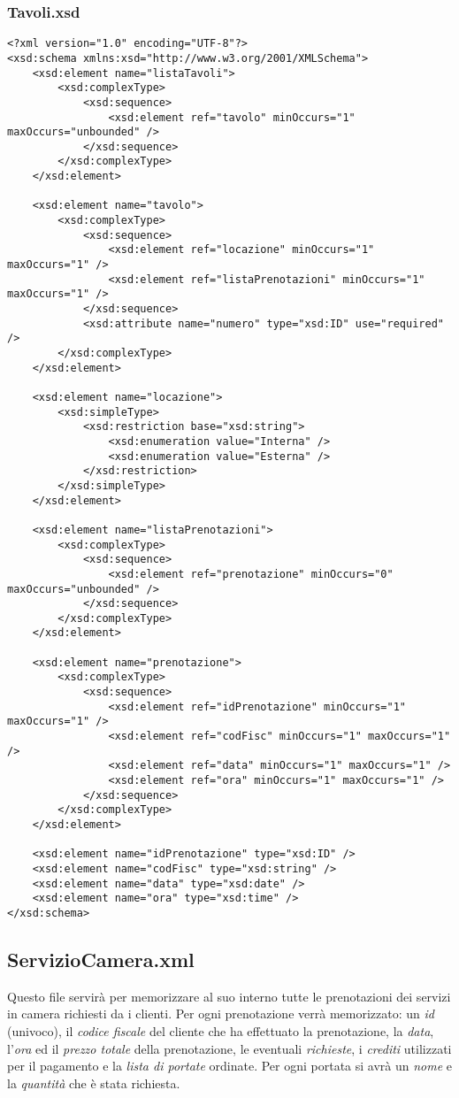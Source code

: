\documentclass [a4paper, 12pt]{book}
\begin{document}
\subsubsection{Tavoli.xsd}
\begin{lstlisting}[style=XML]
<?xml version="1.0" encoding="UTF-8"?>
<xsd:schema xmlns:xsd="http://www.w3.org/2001/XMLSchema">
    <xsd:element name="listaTavoli">
        <xsd:complexType>
            <xsd:sequence>
                <xsd:element ref="tavolo" minOccurs="1" maxOccurs="unbounded" />
            </xsd:sequence>
        </xsd:complexType>
    </xsd:element>

    <xsd:element name="tavolo">
        <xsd:complexType>
            <xsd:sequence>
                <xsd:element ref="locazione" minOccurs="1" maxOccurs="1" />
                <xsd:element ref="listaPrenotazioni" minOccurs="1" maxOccurs="1" />
            </xsd:sequence>
            <xsd:attribute name="numero" type="xsd:ID" use="required" />
        </xsd:complexType>
    </xsd:element>

    <xsd:element name="locazione">
        <xsd:simpleType>
            <xsd:restriction base="xsd:string">
                <xsd:enumeration value="Interna" />
                <xsd:enumeration value="Esterna" />
            </xsd:restriction>
        </xsd:simpleType>
    </xsd:element>
    
    <xsd:element name="listaPrenotazioni">
        <xsd:complexType>
            <xsd:sequence>
                <xsd:element ref="prenotazione" minOccurs="0" maxOccurs="unbounded" />
            </xsd:sequence>
        </xsd:complexType>
    </xsd:element>

    <xsd:element name="prenotazione">
        <xsd:complexType>
            <xsd:sequence>
                <xsd:element ref="idPrenotazione" minOccurs="1" maxOccurs="1" />
                <xsd:element ref="codFisc" minOccurs="1" maxOccurs="1" />
                <xsd:element ref="data" minOccurs="1" maxOccurs="1" />
                <xsd:element ref="ora" minOccurs="1" maxOccurs="1" />
            </xsd:sequence>
        </xsd:complexType>
    </xsd:element>

    <xsd:element name="idPrenotazione" type="xsd:ID" />
    <xsd:element name="codFisc" type="xsd:string" />
    <xsd:element name="data" type="xsd:date" />
    <xsd:element name="ora" type="xsd:time" />
</xsd:schema>
\end{lstlisting}

\medskip

\subsection{ServizioCamera.xml}
Questo file servirà per memorizzare al suo interno tutte le prenotazioni dei servizi in camera richiesti da i clienti. Per ogni prenotazione verrà memorizzato: un \textit{id} (univoco), il \textit{codice fiscale} del cliente che ha effettuato la prenotazione, la \textit{data}, l'\textit{ora} ed il \textit{prezzo totale} della prenotazione, le eventuali \textit{richieste}, i \textit{crediti} utilizzati per il pagamento e la \textit{lista di portate} ordinate. Per ogni portata si avrà un \textit{nome} e la \textit{quantità} che è stata richiesta.
\end{document}
